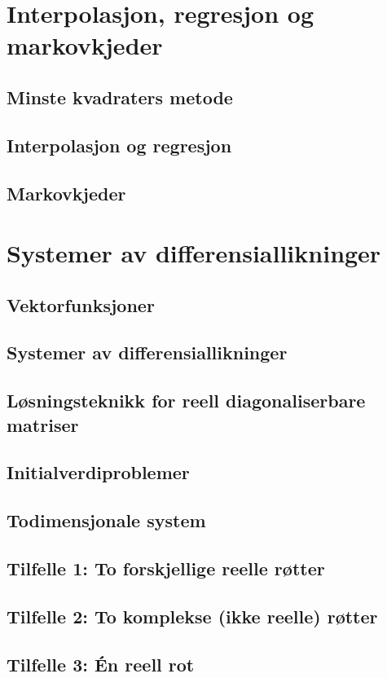 \documentclass{article}
\begin{document}
\section{Interpolasjon, regresjon og markovkjeder}

\subsection{Minste kvadraters metode}
\subsection{Interpolasjon og regresjon}
\subsection{Markovkjeder}


\section{Systemer av differensiallikninger}

\subsection{Vektorfunksjoner}
\subsection{Systemer av differensiallikninger}
\subsection{Løsningsteknikk for reell diagonaliserbare matriser}
\subsection{Initialverdiproblemer}
\subsection{Todimensjonale system}
\subsection{Tilfelle 1: To forskjellige reelle røtter}
\subsection{Tilfelle 2: To komplekse (ikke reelle) røtter}
\subsection{Tilfelle 3: Én reell rot}
\end{document}
